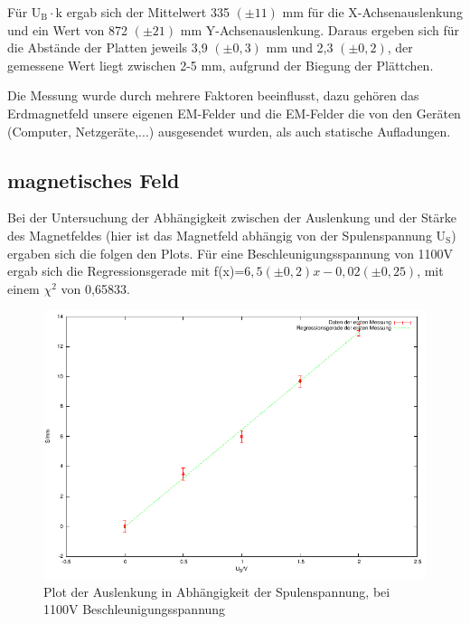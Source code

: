 \documentclass[12pt]{scrartcl}
\begin{document}
Für U$_\text{B} \cdot \text{k}$ ergab sich der Mittelwert 335 $(\pm 11)$ mm für die X-Achsenauslenkung und ein Wert von 872	$(\pm 21)$ mm Y-Achsenauslenkung.
Daraus ergeben sich für die Abstände der Platten jeweils 3,9 $(\pm 0,3)$ mm und 2,3	$(\pm 0,2)$, der gemessene Wert liegt zwischen 2-5 mm, aufgrund der Biegung der Plättchen.

Die Messung wurde durch mehrere Faktoren beeinflusst, dazu gehören das Erdmagnetfeld unsere eigenen EM-Felder und die EM-Felder die von den Geräten (Computer, Netzgeräte,...) ausgesendet wurden, als auch statische Aufladungen.

\subsection{magnetisches Feld}

Bei der Untersuchung der Abhängigkeit zwischen der Auslenkung und der Stärke des Magnetfeldes (hier ist das Magnetfeld abhängig von der Spulenspannung U$_\text{S}$) ergaben sich die folgen den Plots.
\newpage
Für eine Beschleunigungsspannung von 1100V ergab sich die Regressionsgerade mit f(x)=$6,5 (\pm 0,2) x  - 0,02 (\pm 0,25)$, mit einem $\chi^2$ von 0,65833.

\begin{figure}[htbp] 
  \centering
    \includegraphics[scale = 1]{b_1.pdf}
  	\caption[Plot der Auslenkung in Abhängigkeit der Spulenspannung, bei 1100V Beschleunigungsspannung]{Plot der Auslenkung in Abhängigkeit der Spulenspannung, bei 1100V Beschleunigungsspannung}
  \label{fig:x_1}
\end{figure}

\newpage
\end{document}
